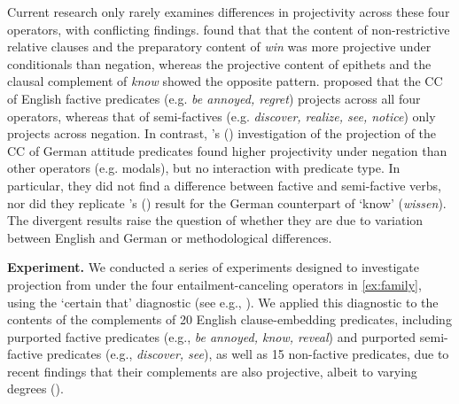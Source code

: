 \documentclass[12pt, a4paper]{article}
\newcommand{\posscite}[1]{\citeauthor{#1}'s (\citeyear{#1})}
\begin{document}
	\vspace{-.5\baselineskip}
	\noindent  Current research only rarely examines differences in projectivity across these four operators, with conflicting findings.
	\citet{smith_relationship_2014} found that that the content of non-restrictive relative clauses and the preparatory content of \emph{win} was more projective under conditionals than negation, whereas the projective content of epithets and the clausal complement of \emph{know} showed the opposite pattern.
	\citet{karttunen_observations_1971} proposed that the CC of English factive predicates (e.g. \emph{be annoyed, regret}) projects across all four operators, whereas that of semi-factives (e.g. \emph{discover, realize, see, notice}) only projects across negation.
	In contrast, \posscite{sieker_projective_2022} investigation of the projection of the CC of German attitude predicates found higher projectivity under negation than other operators (e.g. modals), but no interaction with predicate type. In particular, they did not find a difference between factive and semi-factive verbs, nor did they replicate \posscite{smith_relationship_2014} result for the German counterpart of `know' (\emph{wissen}).
	The divergent results raise the question of whether they are due to variation between English and German or methodological differences.


\noindent
{\bfseries Experiment.}
	We conducted a series of experiments designed to investigate projection from under the four entailment-canceling operators in \ref{ex:family}, using the `certain that' diagnostic (see e.g., \citealp{tonhauser_how_2018,djarv_prosodic_2017,mahler_social_2020,sieker_projective_2022}). We applied this diagnostic to the contents of the complements of 20 English clause-embedding predicates, including purported factive predicates (e.g., \emph{be annoyed, know, reveal}) and purported semi-factive predicates (e.g., \emph{discover, see}),
	as well as 15 non-factive predicates, due to recent findings that their complements are also projective, albeit to varying degrees (\citealt{degen_are_2022}).
\end{document}
